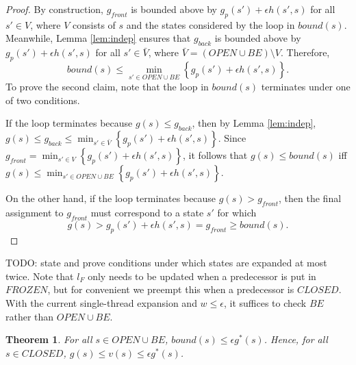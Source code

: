 \documentclass[letterpaper]{article}
\newtheorem{thm}{Theorem}
\begin{document}
\begin{proof}
By construction, $g_{front}$ is bounded above by $g_p(s') + \epsilon h(s',s)$ for all $s'\in V$, where $V$ consists of $s$ and the states considered by the loop in $bound(s)$. Meanwhile, Lemma \ref{lem:indep} ensures that $g_{back}$ is bounded above by $g_p(s') + \epsilon h(s',s)$ for all $s'\in \bar V$, where $\bar V = (OPEN \cup BE) \setminus V$. Therefore,
\[bound(s) \le \min_{s' \in OPEN \cup BE} \left\{g_p(s') + \epsilon h(s',s)\right\}.\]
To prove the second claim, note that the loop in $bound(s)$ terminates under one of two conditions.

If the loop terminates because $g(s) \le g_{back}$, then by Lemma \ref{lem:indep}, $g(s) \le g_{back} \le \min_{s'\in \bar V} \left\{ g_p(s') + \epsilon h(s',s) \right\}$. Since $g_{front} = \min_{s'\in V} \left\{ g_p(s') + \epsilon h(s',s) \right\}$, it follows that $g(s) \le bound(s)$ iff $g(s) \le \min_{s'\in OPEN \cup BE} \left\{ g_p(s') + \epsilon h(s',s) \right\}$.

On the other hand, if the loop terminates because $g(s) > g_{front}$, then the final assignment to $g_{front}$ must correspond to a state $s'$ for which
\[g(s) > g_p(s') + \epsilon h(s',s) = g_{front} \ge bound(s).\]
\end{proof}

TODO: state and prove conditions under which states are expanded at most twice. Note that $l_F$ only needs to be updated when a predecessor is put in $FROZEN$, but for convenient we preempt this when a predecessor is $CLOSED$. With the current single-thread expansion and $w\le\epsilon$, it suffices to check $BE$ rather than $OPEN \cup BE$.

\begin{thm}
\label{thm:subopt}
For all $s\in OPEN\cup BE$, $bound(s) \le \epsilon g^*(s)$. Hence, for all $s\in CLOSED$, $g(s) \le v(s) \le \epsilon g^*(s)$.
\end{thm}
\end{document}
